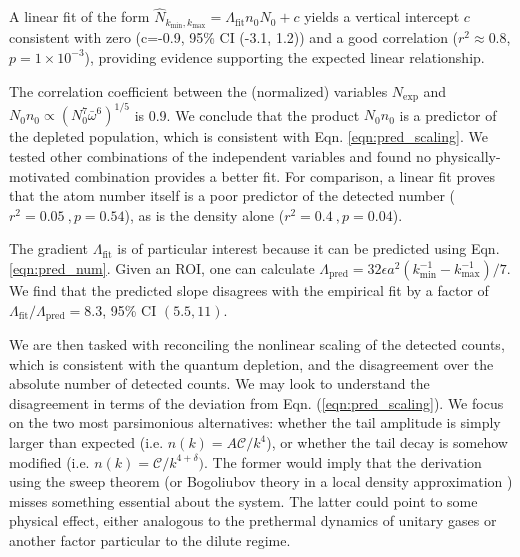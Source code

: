 	


	A linear fit of the form $\hat{N}_{k_\textrm{min},k_\textrm{max}} = \Lambda_\textrm{fit} n_0 N_0 + c$ yields a vertical intercept $c$ consistent with zero (c=-0.9,  95\% CI (-3.1, 1.2)) and a good correlation ($r^2\approx0.8$, $p=1\times10^{-3}$), providing evidence supporting the expected linear relationship.
	
	The correlation coefficient between the (normalized) variables $N_\textrm{exp}$ and $N_0n_0\propto(N_0^7\bar{\omega}^6)^{1/5}$ is 0.9.
	We conclude that the product $N_0n_0$ is a predictor of the depleted population, which is consistent with Eqn.
	\ref{eqn:pred_scaling}.
	We tested other combinations of the independent variables and found no physically-motivated combination provides a better fit.
	For comparison, a linear fit proves that the atom number itself is a poor predictor of the detected number ($r^2=0.05~,p=0.54$), as is the density alone ($r^2=0.4~,p=0.04$).

	The gradient $\Lambda_\textrm{fit}$ is of particular interest because it can be predicted using Eqn.
	\ref{eqn:pred_num}.
	Given an ROI, one can calculate $\Lambda_\textrm{pred} = 32 \epsilon a^2(k_{\textrm{min}}^{-1}-k_{\textrm{max}}^{-1})/7$.
	We find that the predicted slope disagrees with the empirical fit by a factor of $\Lambda_\textrm{fit}/\Lambda_\textrm{pred}= 8.3$, 95\% CI $(5.5,11)$.


	We are then tasked with reconciling the nonlinear scaling of the detected counts, which is consistent with the quantum depletion, and the disagreement over the absolute number of detected counts.
	We may look to understand the disagreement in terms of the deviation from Eqn.
	(\ref{eqn:pred_scaling}).
	We focus on the two most parsimonious alternatives: whether the tail amplitude is simply larger than expected (i.e.
	$n(k)=A\mathcal{C}/k^4$), or whether the tail decay is somehow modified (i.e.
	$n(k)=\mathcal{C}/k^{4+\delta})$.
	The former would imply that the derivation using the sweep theorem (or Bogoliubov theory in a local density approximation \cite{Chang16}) misses something essential about the system.
	The latter could point to some physical effect, either analogous to the prethermal dynamics of unitary gases \cite{Makotyn14,Eigen18,Colussi20,Kira15_coherent,Smith14} or another factor particular to the dilute regime.
	
